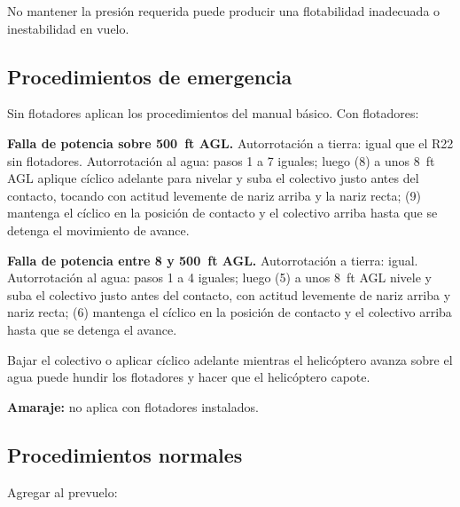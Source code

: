 
\begin{precaucion}
No mantener la presión requerida puede producir una flotabilidad inadecuada o inestabilidad en vuelo.
\end{precaucion}

\subsection{Procedimientos de emergencia}

Sin flotadores aplican los procedimientos del manual básico. Con flotadores:

\textbf{Falla de potencia sobre 500~ft AGL.} Autorrotación a tierra: igual que el R22 sin flotadores. Autorrotación al agua: pasos 1 a 7 iguales; luego (8) a unos 8~ft AGL aplique cíclico adelante para nivelar y suba el colectivo justo antes del contacto, tocando con actitud levemente de nariz arriba y la nariz recta; (9) mantenga el cíclico en la posición de contacto y el colectivo arriba hasta que se detenga el movimiento de avance.

\textbf{Falla de potencia entre 8 y 500~ft AGL.} Autorrotación a tierra: igual. Autorrotación al agua: pasos 1 a 4 iguales; luego (5) a unos 8~ft AGL nivele y suba el colectivo justo antes del contacto, con actitud levemente de nariz arriba y nariz recta; (6) mantenga el cíclico en la posición de contacto y el colectivo arriba hasta que se detenga el avance.

\begin{precaucion}
Bajar el colectivo o aplicar cíclico adelante mientras el helicóptero avanza sobre el agua puede hundir los flotadores y hacer que el helicóptero capote.
\end{precaucion}

\textbf{Amaraje:} no aplica con flotadores instalados.

\subsection{Procedimientos normales}

Agregar al prevuelo:

\begin{checklist}
\end{checklist}

